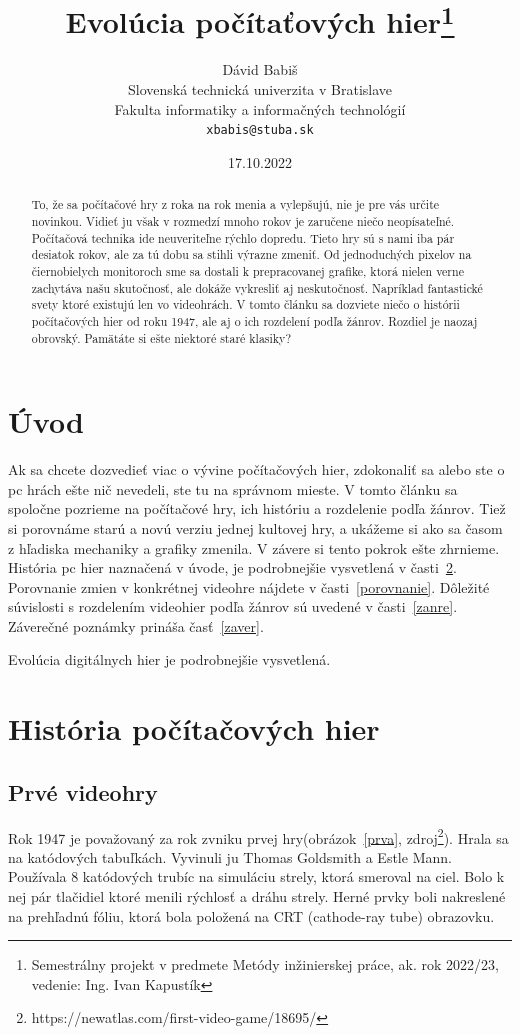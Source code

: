 \documentclass[10pt,oneside,slovak,a4paper]{article}
\title{Evolúcia počítaťových hier\thanks{Semestrálny projekt v predmete Metódy inžinierskej práce, ak. rok 2022/23, vedenie: Ing. Ivan Kapustík}} %
\author{Dávid Babiš\\[2pt]
	{\small Slovenská technická univerzita v Bratislave}\\
	{\small Fakulta informatiky a informačných technológií}\\
	{\small \texttt{xbabis@stuba.sk}}
	}
\date{\small 17.10.2022} %
\begin{document}
\maketitle

\begin{abstract}
To, že sa počítačové hry z roka na rok menia a vylepšujú, nie je pre vás určite novinkou. Vidieť ju však v rozmedzí mnoho rokov je zaručene niečo neopísateľné. Počítačová technika ide neuveriteľne rýchlo dopredu. Tieto hry sú s nami iba pár desiatok rokov, ale za tú dobu sa stihli výrazne zmeniť. Od jednoduchých pixelov na čiernobielych monitoroch sme sa dostali k prepracovanej grafike, ktorá nielen verne zachytáva našu skutočnosť, ale dokáže vykresliť aj neskutočnosť. Napríklad fantastické svety ktoré existujú len vo videohrách.  V tomto článku sa dozviete niečo o histórii počítačových hier od roku 1947, ale aj o ich rozdelení podľa žánrov. Rozdiel je naozaj obrovský. Pamätáte si ešte niektoré staré klasiky?
\end{abstract}



\section{Úvod}
Ak sa chcete dozvedieť viac o vývine počítačových hier, zdokonaliť sa alebo ste o pc hrách ešte nič nevedeli, ste tu na správnom mieste. V tomto článku sa spoločne pozrieme na počítačové hry, ich históriu a rozdelenie podľa žánrov. Tiež si porovnáme starú a novú verziu jednej kultovej hry, a ukážeme si ako sa časom z hľadiska mechaniky a grafiky zmenila. V závere si tento pokrok ešte zhrnieme. História pc hier naznačená v úvode, je podrobnejšie vysvetlená v časti~\ref{historia}. Porovnanie zmien v konkrétnej videohre nájdete v časti~\ref{porovnanie}. 
Dôležité súvislosti s rozdelením videohier podľa žánrov sú uvedené v časti~\ref{zanre}.
Záverečné poznámky prináša časť~\ref{zaver}.

Evolúcia digitálnych hier je podrobnejšie vysvetlená\cite{sahay}.

\section{História počítačových hier} \label{historia}

\subsection{Prvé videohry}
Rok 1947 je považovaný za rok zvniku prvej hry(obrázok~\ref{prva}, zdroj\footnote{https://newatlas.com/first-video-game/18695/}). Hrala sa na katódových tabuľkách. Vyvinuli ju Thomas Goldsmith a Estle Mann. Používala 8 katódových trubíc na simuláciu strely, ktorá smeroval na ciel. Bolo k nej pár tlačidiel ktoré menili rýchlosť a dráhu strely. Herné prvky boli nakreslené na prehľadnú fóliu, ktorá bola položená na CRT (cathode-ray tube) obrazovku.
\end{document}
